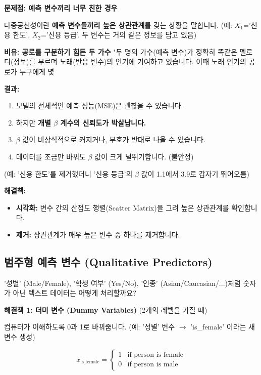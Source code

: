 \documentclass[11pt,a4paper]{book}
\theoremstyle{definition}
\begin{document}
\begin{warningbox}
\textbf{문제점: 예측 변수끼리 너무 친한 경우}

다중공선성이란 \textbf{예측 변수들끼리 높은 상관관계}를 갖는 상황을 말합니다.
(예: $X_1$='신용 한도', $X_2$='신용 등급'. 두 변수는 거의 같은 정보를 담고 있음)

\textbf{비유: 공로를 구분하기 힘든 두 가수}
"두 명의 가수(예측 변수)가 정확히 똑같은 멜로디(정보)를 부르며 노래(반응 변수)의 인기에 기여하고 있습니다. 이때 노래 인기의 공로가 누구에게 몇 %

\textbf{결과:}
\begin{enumerate}
    \item 모델의 전체적인 예측 성능(MSE)은 괜찮을 수 있습니다.
    \item 하지만 \textbf{개별 $\beta$ 계수의 신뢰도가 박살납니다.}
    \item $\beta$ 값이 비상식적으로 커지거나, 부호가 반대로 나올 수 있습니다.
    \item 데이터를 조금만 바꿔도 $\beta$ 값이 크게 널뛰기합니다. (불안정)
\end{enumerate}
(예: '신용 한도'를 제거했더니 '신용 등급'의 $\beta$ 값이 1.1에서 3.9로 갑자기 뛰어오름)
\end{warningbox}

\textbf{해결책:}
\begin{itemize}
    \item \textbf{시각화:} 변수 간의 산점도 행렬(Scatter Matrix)을 그려 높은 상관관계를 확인합니다.
    \item \textbf{제거:} 상관관계가 매우 높은 변수 중 하나를 제거합니다.
\end{itemize}

\subsection{범주형 예측 변수 (Qualitative Predictors)}

'성별' (Male/Female), '학생 여부' (Yes/No), '인종' (Asian/Caucasian/...)처럼 숫자가 아닌 텍스트 데이터는 어떻게 처리할까요?

\textbf{해결책 1: 더미 변수 (Dummy Variables)} (2개의 레벨을 가질 때)

컴퓨터가 이해하도록 0과 1로 바꿔줍니다.
(예: '성별' 변수 $\rightarrow$ 'is\_female' 이라는 새 변수 생성)

$$ x_{\text{is\_female}} = \begin{cases} 1 & \text{if person is female} \\ 0 & \text{if person is male} \end{cases} $$
\end{document}
